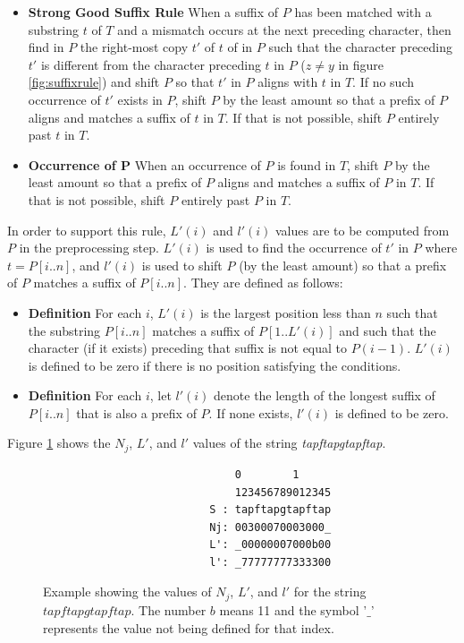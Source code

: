 \begin{itemize}
    \item[] \textbf{Strong Good Suffix Rule} When a suffix of $P$ has been matched with a substring $t$ of $T$ and a mismatch occurs at the next preceding character, then find in $P$ the right-most copy $t'$ of $t$ of in $P$ such that the character preceding $t'$ is different from the character preceding $t$ in $P$ ($z\neq y$ in figure \ref{fig:suffixrule}) and shift $P$ so that $t'$ in $P$ aligns with $t$ in $T$. If no such occurrence of $t'$ exists in $P$, shift $P$ by the least amount so that a prefix of $P$ aligns and matches a suffix of $t$ in $T$. If that is not possible, shift $P$ entirely past $t$ in $T$. 
    \item[] \textbf{Occurrence of P} When an occurrence of $P$ is found in $T$, shift $P$ by the least amount so that a prefix of $P$ aligns and matches a suffix of $P$ in $T$. If that is not possible, shift $P$ entirely past $P$ in $T$. 
\end{itemize}

In order to support this rule, $L'(i)$ and $l'(i)$ values are to be computed from $P$ in the preprocessing step. $L'(i)$ is used to find the occurrence of $t'$ in $P$ where $t=P[i..n]$, and $l'(i)$ is used to shift $P$ (by the least amount) so that a prefix of $P$ matches a suffix of $P[i..n]$. They are defined as follows:

\begin{itemize}
    \item[] \textbf{Definition} For each $i$, $L'(i)$ is the largest position less than $n$ such that the substring $P[i..n]$ matches a suffix of $P[1..L'(i)]$ and such that the character (if it exists) preceding that suffix is not equal to $P(i-1)$. $L'(i)$ is defined to be zero if there is no position satisfying the conditions. 
    \item[] \textbf{Definition} For each $i$, let $l'(i)$ denote the length of the longest suffix of $P[i..n]$ that is also a prefix of $P$. If none exists, $l'(i)$ is defined to be zero. 
\end{itemize}

Figure \ref{fig:gsr-example} shows the $N_j$, $L'$, and $l'$ values of the string \textit{tapftapgtapftap}.
\begin{figure}[ht!]
\begin{verbatim}
                              0        1      
                              123456789012345 
                          S : tapftapgtapftap 
                          Nj: 00300070003000_ 
                          L': _00000007000b00 
                          l': _77777777333300 
\end{verbatim}
\caption{Example showing the values of $N_j$, $L'$, and $l'$ for the string $tapftapgtapftap$. The number $b$ means 11 and the symbol '$\_$' represents the value not being defined for that index. }
\label{fig:gsr-example}
\end{figure}

